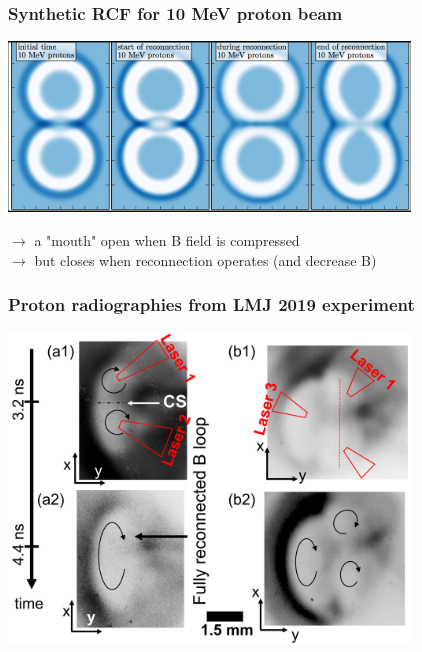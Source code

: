 \documentclass{beamer}
\begin{document}
\begin{frame}
\frametitle{Synthetic RCF for 10 MeV proton beam}

\begin{center}
\includegraphics[width=0.8\textwidth]{rcf2D.png}
\end{center}

$\to$ a "mouth" open when B field is compressed\\
$\to$ but closes when reconnection operates (and decrease B)\\

\end{frame}



\begin{frame}
\frametitle{Proton radiographies from LMJ 2019 experiment}

\begin{center}
\includegraphics[width=0.8\textwidth]{rcf_lmj.png}
\end{center}

\end{frame}
\end{document}
